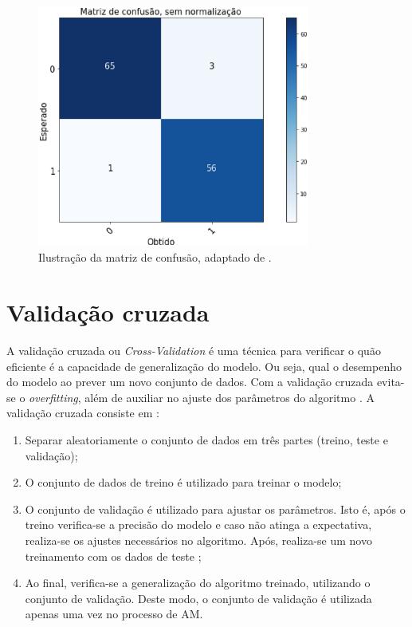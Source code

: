 \begin{figure}[!htb]
	\centering
	\includegraphics[width=0.8\textwidth]{figuras/matriz_consusao.eps}
	\caption{Ilustração da matriz de confusão, adaptado de .}
	\label{matriz_consusao}
\end{figure}

\section{Validação cruzada}
\label{sc:crossvalidation}
A validação cruzada ou \textit{Cross-Validation} é uma técnica para verificar o quão eficiente é a capacidade de generalização do modelo. Ou seja, qual o desempenho do modelo ao prever um novo conjunto de dados. Com a validação cruzada evita-se o \textit{overfitting}, além de auxiliar no ajuste dos parâmetros do algoritmo \cite{james2013introduction}. A validação cruzada consiste em \cite{james2013introduction}:

\begin{enumerate}
    \item Separar aleatoriamente o conjunto de dados em três partes (treino, teste e validação);
    \item O conjunto de dados de treino é utilizado para treinar o modelo;
    \item O conjunto de validação é utilizado para ajustar os parâmetros. Isto é, após o treino verifica-se a precisão do modelo e caso não atinga a expectativa, realiza-se os ajustes necessários no algoritmo. Após, realiza-se um novo treinamento com os dados de teste \cite{raschka2015python};
    \item Ao final, verifica-se a generalização do algoritmo treinado, utilizando o conjunto de validação. Deste modo, o conjunto de validação é utilizada apenas uma vez no processo de AM.
\end{enumerate}

